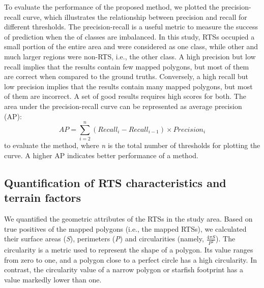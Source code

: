 \documentclass[authoryear,preprint,review,12pt]{elsarticle}
\begin{document}
To evaluate the performance of the proposed method, we plotted the precision-recall curve, which illustrates the relationship between precision and recall for different  thresholds. The precision-recall is a useful metric to measure the success of prediction when the  of classes are imbalanced. In this study, RTSs occupied a small portion of the entire area and were considered as one class, while other and much larger regions were non-RTS, i.e., the other class. A high precision but low recall implies that the results contain few mapped polygons, but most of them are correct when compared to the ground truths. Conversely, a high recall but low precision implies that the results contain many mapped polygons, but most of them are incorrect. A set of good results requires high scores for both. The area under the precision-recall curve can be represented as average precision (AP):
\begin{equation}
AP=\sum_{i=2}^{n} (Recall_i - Recall_{i-1})\times Precision_i 
\label{equ_ap}
\end{equation}
to evaluate the method, where \emph{n} is the total number of thresholds for plotting the curve. A higher AP indicates better performance of a method.


\subsection{Quantification of RTS characteristics and terrain factors}
\label{subsec_quantify_rts}

We quantified the geometric attributes of the RTSs in the study area. Based on true positives of the mapped polygons (i.e., the mapped RTSs), we calculated their surface areas (\emph{S}), perimeters (\emph{P}) and circularities (namely, $\frac{4 \pi S}{P^2} $). The circularity is a metric used to represent the shape of a polygon. Its value ranges from zero to one, and a polygon close to a perfect circle has a high circularity. In contrast, the circularity value of a narrow polygon or starfish footprint has a value markedly lower than one. 
\end{document}
